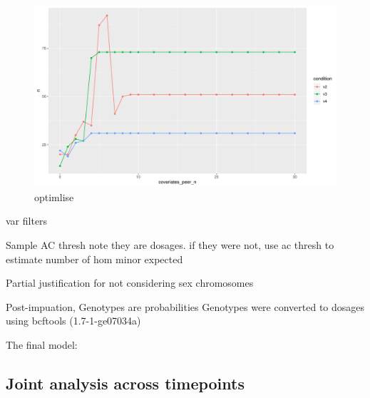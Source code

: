 \begin{figure}
    \centering
    \includegraphics[width=1.0\textwidth,page=1]{mainmatter/figures/chapter_03/count_eGenes.signif_eGenes_vs_PEER_n.dataset_mega.chr_chr1.pdf}
    \caption{optimlise}
    \label{fig:hird_neGenesvsPeerK}
\end{figure}

var filters

    Sample AC thresh
        note they are dosages. if they were not, use ac thresh to estimate number of hom minor expected

    Partial justification for not considering sex chromosomes

Post-impuation, Genotypes are probabilities
    Genotypes were converted to dosages using bcftools (1.7-1-ge07034a)

The final model:



\subsection{Joint  analysis across timepoints}

